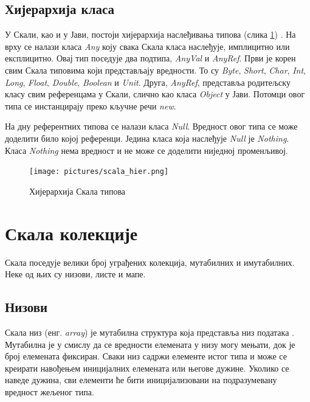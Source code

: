 \documentclass[12pt,oneside]{memoir}
\begin{document}
\subsection{Хијерархија класа}
\label{subsec:scala_class_hier}

У Скали, као и у Јави, постоји хијерархија наслеђивања типова (слика \ref{fig:scala_types_hier}) \cite{scala_prog}. На врху се налази класа \textit{Any} коју свака Скала класа наслеђује, имплицитно или експлицитно. Овај тип поседује два подтипа, \textit{AnyVal} и \textit{AnyRef}. Први је корен свим Скала типовима који представљају вредности. То су \textit{Byte}, \textit{Short}, \textit{Char}, \textit{Int}, \textit{Long}, \textit{Float}, \textit{Double}, \textit{Boolean} и \textit{Unit}. Друга, \textit{AnyRef}, представља родитељску класу свим референцама у Скали, слично као класа \textit{Object} у Јави. Потомци овог типа се инстанцирају преко кључне речи \textit{new}.

На дну референтних типова се налази класа \textit{Null}. Вредност овог типа се може доделити било којој референци. Једина класа која наслеђује \textit{Null} је \textit{Nothing}. Класа \textit{Nothing} нема вредност и не може се доделити ниједној променљивој.

\begin{figure}[!ht]
  \centering
  \texttt{[image: pictures/scala\_hier.png]}
  \caption{Хијерархија Скала типова}
  \label{fig:scala_types_hier}
\end{figure}

\section{Скала колекције}
\label{sec:scala_coll}

Скала поседује велики број уграђених колекција, мутабилних и имутабилних. Неке од њих су низови, листе и мапе.

\subsection{Низови}
\label{subsec:scala_arrays}

Скала низ (енг. \textit{array}) је мутабилна структура која представља низ података \cite{scala_prog}. Мутабилна је у смислу да се вредности елемената у низу могу мењати, док је број елемената фиксиран. Сваки низ садржи елементе истог типа и може се креирати навођењем иницијалних елемената или његове дужине. Уколико се наведе дужина, сви елементи ће бити иницијализовани на подразумевану вредност жељеног типа.
\end{document}
